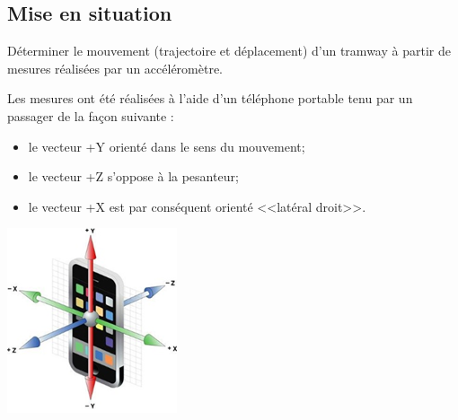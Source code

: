 \documentclass[10pt,fleqn]{article} %
\begin{document}

\vspace{8cm}
\pagestyle{fancy}
\thispagestyle{plain}


\def\columnseprulecolor{\color{ocre}}
\setlength{\columnseprule}{0.4pt} 
\begin{multicols}{2}

\subsection*{Mise en situation}

\begin{obj}
Déterminer le mouvement (trajectoire et déplacement) d’un tramway à partir de mesures réalisées par un accéléromètre.
\end{obj}
\begin{minipage}[c]{.7\linewidth}
Les mesures ont été réalisées à l’aide d’un téléphone portable tenu par un passager de la façon suivante :
\begin{itemize}
\item le vecteur +Y orienté dans le sens du mouvement;
\item le vecteur +Z s'oppose à la pesanteur;
\item le vecteur +X est par conséquent orienté <<latéral droit>>.
\end{itemize}
\end{minipage}\hfill
\begin{minipage}[c]{.28\linewidth}
\begin{center}
\includegraphics[width=\linewidth]{images/fig_02}
\end{center}
\end{minipage}

\end{multicols}
\end{document}
